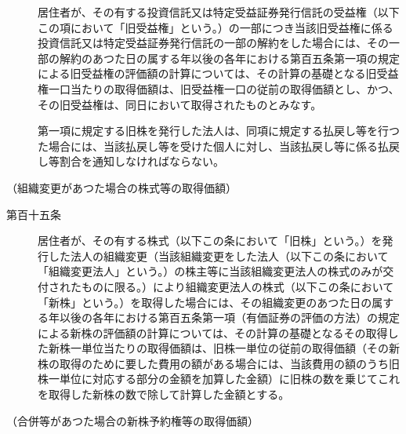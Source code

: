 \documentclass[twocolumn,a4j,10pt]{ltjtarticle}
\begin{document}
\begin{description}
\item[]居住者が、その有する投資信託又は特定受益証券発行信託の受益権（以下この項において「旧受益権」という。）の一部につき当該旧受益権に係る投資信託又は特定受益証券発行信託の一部の解約をした場合には、その一部の解約のあつた日の属する年以後の各年における第百五条第一項の規定による旧受益権の評価額の計算については、その計算の基礎となる旧受益権一口当たりの取得価額は、旧受益権一口の従前の取得価額とし、かつ、その旧受益権は、同日において取得されたものとみなす。
\item[]第一項に規定する旧株を発行した法人は、同項に規定する払戻し等を行つた場合には、当該払戻し等を受けた個人に対し、当該払戻し等に係る払戻し等割合を通知しなければならない。
\end{description}
\noindent\hspace{10pt}（組織変更があつた場合の株式等の取得価額）
\begin{description}
\item[第百十五条]居住者が、その有する株式（以下この条において「旧株」という。）を発行した法人の組織変更（当該組織変更をした法人（以下この条において「組織変更法人」という。）の株主等に当該組織変更法人の株式のみが交付されたものに限る。）により組織変更法人の株式（以下この条において「新株」という。）を取得した場合には、その組織変更のあつた日の属する年以後の各年における第百五条第一項（有価証券の評価の方法）の規定による新株の評価額の計算については、その計算の基礎となるその取得した新株一単位当たりの取得価額は、旧株一単位の従前の取得価額（その新株の取得のために要した費用の額がある場合には、当該費用の額のうち旧株一単位に対応する部分の金額を加算した金額）に旧株の数を乗じてこれを取得した新株の数で除して計算した金額とする。
\end{description}
\noindent\hspace{10pt}（合併等があつた場合の新株予約権等の取得価額）
\end{document}
